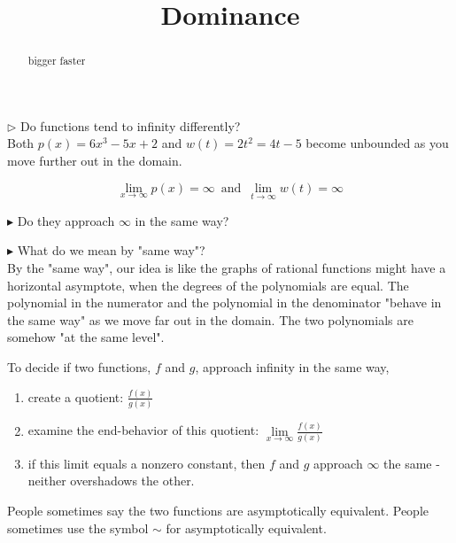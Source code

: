 \documentclass{ximera}
\title{Dominance}
\begin{document}
\begin{abstract}
bigger faster
\end{abstract}
\maketitle







$\rhd$ Do functions tend to infinity differently? \\




Both $p(x) = 6x^3 - 5x + 2$ and $w(t) = 2t^2 = 4t - 5$ become unbounded as you move further out in the domain.



\[    \lim_{x \to \infty} p(x) = \infty  \, \text{ and }  \,       \lim_{t \to \infty} w(t) = \infty                \]

$\blacktriangleright$ Do they approach $\infty$ in the same way? 

$\blacktriangleright$ What do we mean by "same way"?  \\






By the "same way", our idea is like the graphs of rational functions might have a horizontal asymptote, when the degrees of the polynomials are equal.   The polynomial in the numerator and the polynomial in the denominator "behave in the same way" as we move far out in the domain.  The two polynomials are somehow "at the same level". \\




\begin{idea}


To decide if two functions, $f$ and $g$, approach infinity in the same way, 

\begin{enumerate}
\item create a quotient: $\frac{f(x)}{g(x)}$ \\


\item examine the end-behavior of this quotient: $\lim\limits_{x \to \infty} \frac{f(x)}{g(x)}$ \\


\item if this limit equals a nonzero constant, then $f$ and $g$ approach $\infty$ the same - neither overshadows the other.
\end{enumerate}


People sometimes say the two functions are asymptotically equivalent. People sometimes use the symbol $\sim$ for asymptotically equivalent. \\

\end{idea}
\end{document}
